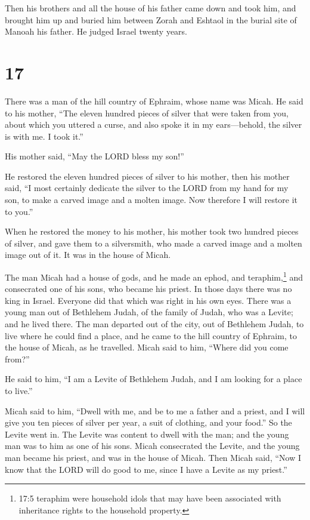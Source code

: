  Then his brothers and all the house of his father came
down and took him, and brought him up and buried him between Zorah and
Eshtaol in the burial site of Manoah his father. He judged Israel twenty
years.

\hypertarget{section-16}{%
\section{17}\label{section-16}}

 There was a man of the hill country of Ephraim, whose name
was Micah.  He said to his mother, ``The eleven hundred
pieces of silver that were taken from you, about which you uttered a
curse, and also spoke it in my ears---behold, the silver is with me. I
took it.''

His mother said, ``May the LORD bless my son!''

 He restored the eleven hundred pieces of silver to his
mother, then his mother said, ``I most certainly dedicate the silver to
the LORD from my hand for my son, to make a carved image and a molten
image. Now therefore I will restore it to you.''

 When he restored the money to his mother, his mother took
two hundred pieces of silver, and gave them to a silversmith, who made a
carved image and a molten image out of it. It was in the house of Micah.

 The man Micah had a house of gods, and he made an ephod,
and teraphim,\footnote{17:5 teraphim were household idols that may have
  been associated with inheritance rights to the household property.}
and consecrated one of his sons, who became his priest.  In
those days there was no king in Israel. Everyone did that which was
right in his own eyes.  There was a young man out of
Bethlehem Judah, of the family of Judah, who was a Levite; and he lived
there.  The man departed out of the city, out of Bethlehem
Judah, to live where he could find a place, and he came to the hill
country of Ephraim, to the house of Micah, as he travelled. 
Micah said to him, ``Where did you come from?''

He said to him, ``I am a Levite of Bethlehem Judah, and I am looking for
a place to live.''

 Micah said to him, ``Dwell with me, and be to me a father
and a priest, and I will give you ten pieces of silver per year, a suit
of clothing, and your food.'' So the Levite went in.  The
Levite was content to dwell with the man; and the young man was to him
as one of his sons.  Micah consecrated the Levite, and the
young man became his priest, and was in the house of Micah.
 Then Micah said, ``Now I know that the LORD will do good
to me, since I have a Levite as my priest.''

